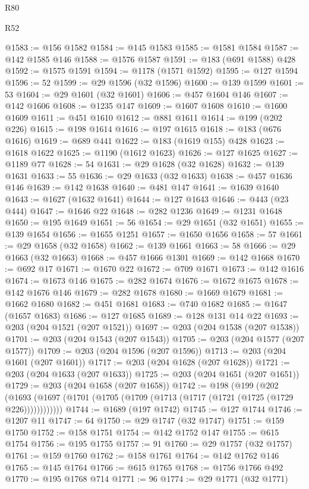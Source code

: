 \begin{lexlean}{R80}
\begin{lexlean}{R52}
\begin{coremodule}
{{{{{{{{{{{{{{{{{{{{{{{{{{{{{{{{{{{{{{{{{{{{{{{{{{{{{{{{{{{{{{{{{{{{{{{{{{{{{{{{{{{{{{{{{{{{{{{{{{{{{{{{{{{{{{{{{{{{{{{{{{{{{{{{{{{{{{{{{{{{{{{{{{{{{{{{{{{{{{{{{{{{{{{{{{{{{{{{{{{{{{{{{{{{{{{{{{{{{{@1583 := @156 @1582
@1584 := @145 @1583
@1585 := @1581 @1584
@1587 := @142 @1585 @146
@1588 := @1576 @1587
@1591 := @183 (@691 @1588) @428
@1592 := @1575 @1591
@1594 := @1178 (@1571 @1592)
@1595 := @127 @1594
@1596 := 52
@1599 := @29 @1596 (@32 @1596)
@1600 := @139 @1599
@1601 := 53
@1604 := @29 @1601 (@32 @1601)
@1606 := @457 @1604 @146
@1607 := @142 @1606
@1608 := @1235 @147
@1609 := @1607 @1608
@1610 := @1600 @1609
@1611 := @451 @1610
@1612 := @881 @1611
@1614 := @199 (@202 @226)
@1615 := @198 @1614
@1616 := @197 @1615
@1618 := @183 (@676 @1616)
@1619 := @689 @441
@1622 := @183 (@1619 @155) @428
@1623 := @1618 @1622
@1625 := @1190 (@1612 @1623)
@1626 := @127 @1625
@1627 := @1189 @77
@1628 := 54
@1631 := @29 @1628 (@32 @1628)
@1632 := @139 @1631
@1633 := 55
@1636 := @29 @1633 (@32 @1633)
@1638 := @457 @1636 @146
@1639 := @142 @1638
@1640 := @481 @147
@1641 := @1639 @1640
@1643 := @1627 (@1632 @1641)
@1644 := @127 @1643
@1646 := @443 (@23 @444)
@1647 := @1646 @22
@1648 := @282 @1236
@1649 := @1231 @1648
@1650 := @195 @1649
@1651 := 56
@1654 := @29 @1651 (@32 @1651)
@1655 := @139 @1654
@1656 := @1655 @1251
@1657 := @1650 @1656
@1658 := 57
@1661 := @29 @1658 (@32 @1658)
@1662 := @139 @1661
@1663 := 58
@1666 := @29 @1663 (@32 @1663)
@1668 := @457 @1666 @1301
@1669 := @142 @1668
@1670 := @692 @17
@1671 := @1670 @22
@1672 := @709 @1671
@1673 := @142 @1616
@1674 := @1673 @146
@1675 := @282 @1674
@1676 := @1672 @1675
@1678 := @142 @1676 @146
@1679 := @282 @1678
@1680 := @1669 @1679
@1681 := @1662 @1680
@1682 := @451 @1681
@1683 := @740 @1682
@1685 := @1647 (@1657 @1683)
@1686 := @127 @1685
@1689 := @128 @131 @14 @22
@1693 := @203 (@204 @1521 (@207 @1521))
@1697 := @203 (@204 @1538 (@207 @1538))
@1701 := @203 (@204 @1543 (@207 @1543))
@1705 := @203 (@204 @1577 (@207 @1577))
@1709 := @203 (@204 @1596 (@207 @1596))
@1713 := @203 (@204 @1601 (@207 @1601))
@1717 := @203 (@204 @1628 (@207 @1628))
@1721 := @203 (@204 @1633 (@207 @1633))
@1725 := @203 (@204 @1651 (@207 @1651))
@1729 := @203 (@204 @1658 (@207 @1658))
@1742 := @198
    (@199
      (@202 (@1693 (@1697 (@1701 (@1705 (@1709 (@1713 (@1717 (@1721 (@1725 (@1729 @226))))))))))))
@1744 := @1689 (@197 @1742)
@1745 := @127 @1744
@1746 := @1207 @11
@1747 := 64
@1750 := @29 @1747 (@32 @1747)
@1751 := @159 @1750
@1752 := @158 @1751
@1754 := @142 @1752 @147
@1755 := @615 @1754
@1756 := @195 @1755
@1757 := 91
@1760 := @29 @1757 (@32 @1757)
@1761 := @159 @1760
@1762 := @158 @1761
@1764 := @142 @1762 @146
@1765 := @145 @1764
@1766 := @615 @1765
@1768 := @1756 @1766 @492
@1770 := @195 @1768 @714
@1771 := 96
@1774 := @29 @1771 (@32 @1771)
}}}}}}}}}}}}}}}}}}}}}}}}}}}}}}}}}}}}}}}}}}}}}}}}}}}}}}}}}}}}}}}}}}}}}}}}}}}}}}}}}}}}}}}}}}}}}}}}}}}}}}}}}}}}}}}}}}}}}}}}}}}}}}}}}}}}}}}}}}}}}}}}}}}}}}}}}}}}}}}}}}}}}}}}}}}}}}}}}}}}}}}}}}}}}}}}}}}}}}
\end{coremodule}
\end{lexlean}
\end{lexlean}
